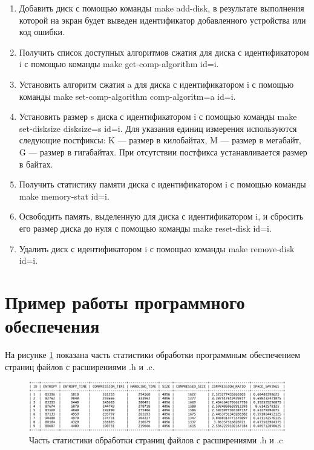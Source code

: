 \begin{enumerate}
    \item Добавить диск с помощью команды make add-disk, в результате выполнения которой на экран будет выведен идентификатор добавленного устройства или код ошибки.
    \item Получить список доступных алгоритмов сжатия для диска с идентификатором i с помощью команды make get-comp-algorithm id=i.
    \item Установить алгоритм сжатия a для диска с идентификатором i с помощью команды make set-comp-algorithm comp-algoritm=a id=i.
    \item Установить размер s диска с идентификатором i с помощью команды make set-disksize disksize=s id=i. Для указания единиц измерения используются следующие постфиксы: K --- размер в килобайтах, M --- размер в мегабайт, G --- размер в гигабайтах. При отсутствии постфикса устанавливается размер в байтах.
    \item Получить статистику памяти диска с идентификатором i с помощью команды make memory-stat id=i.
    \item Освободить память, выделенную для диска с идентификатором i, и сбросить его размер диска до нуля с помощью команды make reset-disk id=i.
    \item Удалить диск с идентификатором i с помощью команды make remove-disk id=i.
\end{enumerate}

\section{Пример работы программного обеспечения}

На рисунке \ref{img:example} показана часть статистики обработки программным обеспечением страниц файлов с расширениями .h и .c.

\begin{figure}[H]
	\begin{center}
		\includegraphics[scale=0.25]{inc/img/example.png}
	\end{center}
	\captionsetup{justification=centering}
	\caption{Часть статистики обработки страниц файлов с расширениями .h и .c}
	\label{img:example}
\end{figure}

